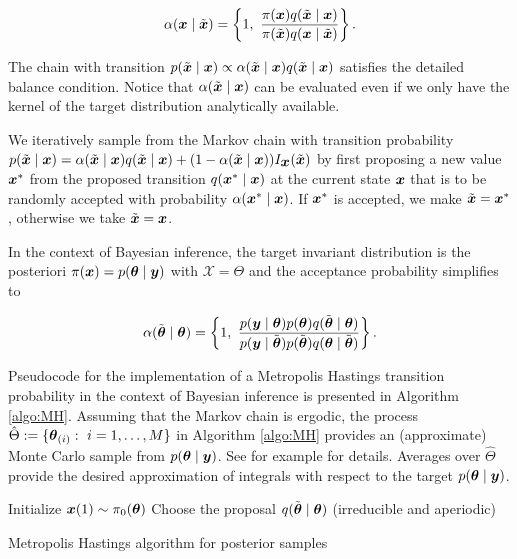 $$\alpha(\mbox{\boldmath $x$} \mid \tilde{\mbox{\boldmath $x$}}) = \left\{ 1, \ \frac{\pi(\mbox{\boldmath $x$})q(\tilde{\mbox{\boldmath $x$}} \mid \mbox{\boldmath $x$})}{\pi(\tilde{\mbox{\boldmath $x$}}) q(\mbox{\boldmath $x$} \mid \tilde{\mbox{\boldmath $x$}})} \right\}.$$

\noindent The chain with transition $p(\tilde{\mbox{\boldmath $x$}} \mid \mbox{\boldmath $x$}) \propto \alpha(\tilde{\mbox{\boldmath $x$}} \mid \mbox{\boldmath $x$}) q(\tilde{\mbox{\boldmath $x$}} \mid \mbox{\boldmath $x$})$ satisfies the detailed balance condition. Notice that $\alpha(\tilde{\mbox{\boldmath $x$}} \mid \mbox{\boldmath $x$})$ can be evaluated even if we only have the kernel of the target distribution analytically available.

We iteratively sample from the Markov chain with transition probability $p(\tilde{\mbox{\boldmath $x$}} \mid \mbox{\boldmath $x$}) = \alpha(\tilde{\mbox{\boldmath $x$}} \mid \mbox{\boldmath $x$})q(\tilde{\mbox{\boldmath $x$}} \mid \mbox{\boldmath $x$}) + (1-\alpha(\tilde{\mbox{\boldmath $x$}}\mid \mbox{\boldmath $x$}) )I_{\mbox{\boldmath $x$}}(\tilde{\mbox{\boldmath $x$}})$ by first proposing a new value $\mbox{\boldmath $x$}^*$ from the proposed transition $q(\mbox{\boldmath $x$}^* \mid \mbox{\boldmath $x$})$ at the current state $\mbox{\boldmath $x$}$ that is to be randomly accepted with probability $\alpha(\mbox{\boldmath $x$}^* \mid \mbox{\boldmath $x$})$. If $\mbox{\boldmath $x$}^*$ is accepted, we make $\tilde{\mbox{\boldmath $x$}} = \mbox{\boldmath $x$}^*$, otherwise we take $\tilde{\mbox{\boldmath $x$}} = \mbox{\boldmath $x$}$.

In the context of Bayesian inference, the target invariant distribution is the posteriori $\pi(\mbox{\boldmath $x$}) = p(\mbox{\boldmath $\theta$} \mid \mbox{\boldmath $y$})$ with $\mathcal{X} = \Theta$ and the acceptance probability simplifies to

$$\alpha(\tilde{\mbox{\boldmath $\theta$}}\mid \mbox{\boldmath $\theta$}) = \left\{ 1, \ \frac{p(\mbox{\boldmath $y$} \mid \mbox{\boldmath $\theta$})p(\mbox{\boldmath $\theta$})q(\tilde{\mbox{\boldmath $\theta$}}\mid \mbox{\boldmath $\theta$})}{p(\mbox{\boldmath $y$} \mid \tilde{\mbox{\boldmath $\theta$}})p(\tilde{\mbox{\boldmath $\theta$}}) q(\mbox{\boldmath $\theta$} \mid \tilde{\mbox{\boldmath $\theta$}})} \right\}.$$

Pseudocode for the implementation of a Metropolis Hastings transition probability in the context of Bayesian inference is presented in Algorithm \ref{algo:MH}. Assuming that the Markov chain is ergodic, the process $\hat{\Theta} := \{\mbox{\boldmath $\theta$}_{(i)}: \ i = 1, \ldots, M\}$ in Algorithm \ref{algo:MH} provides an (approximate) Monte Carlo sample from $p(\mbox{\boldmath $\theta$} \mid \mbox{\boldmath $y$})$. See for example \cite{robert2013} for details. Averages over $\hat{\Theta}$ provide the desired approximation of integrals with respect to the target $p(\mbox{\boldmath $\theta$}\mid \mbox{\boldmath $y$})$.\\

\begin{algorithm}[H]
\SetAlgoLined
 Initialize $\mbox{\boldmath $x$}(1) \sim \pi_0(\mbox{\boldmath $\theta$})$\;
 Choose the proposal $q(\tilde{\mbox{\boldmath $\theta$}} \mid \mbox{\boldmath $\theta$})$ (irreducible and aperiodic)\;
 \caption{Metropolis Hastings algorithm for posterior samples}
 \label{algo:MH}
\end{algorithm}

